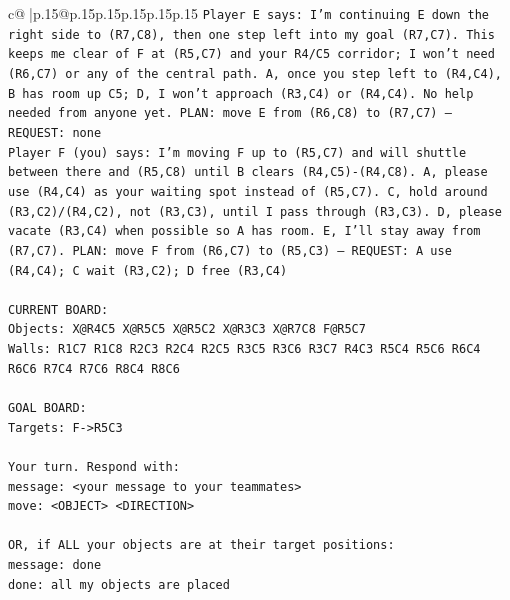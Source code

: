 \documentclass{article}
\begin{document}
{\begin{supertabular}{c@{$\;$}|p{.15\linewidth}@{}p{.15\linewidth}p{.15\linewidth}p{.15\linewidth}p{.15\linewidth}p{.15\linewidth}}
{{{\texttt{Player E says: I'm continuing E down the right side to (R7,C8), then one step left into my goal (R7,C7). This keeps me clear of F at (R5,C7) and your R4/C5 corridor; I won't need (R6,C7) or any of the central path. A, once you step left to (R4,C4), B has room up C5; D, I won't approach (R3,C4) or (R4,C4). No help needed from anyone yet. PLAN: move E from (R6,C8) to (R7,C7) — REQUEST: none} \\
\texttt{Player F (you) says: I'm moving F up to (R5,C7) and will shuttle between there and (R5,C8) until B clears (R4,C5){-}(R4,C8). A, please use (R4,C4) as your waiting spot instead of (R5,C7). C, hold around (R3,C2)/(R4,C2), not (R3,C3), until I pass through (R3,C3). D, please vacate (R3,C4) when possible so A has room. E, I'll stay away from (R7,C7). PLAN: move F from (R6,C7) to (R5,C3) — REQUEST: A use (R4,C4); C wait (R3,C2); D free (R3,C4)} \\
\\ 
\texttt{CURRENT BOARD:} \\
\texttt{Objects: X@R4C5 X@R5C5 X@R5C2 X@R3C3 X@R7C8 F@R5C7} \\
\texttt{Walls: R1C7 R1C8 R2C3 R2C4 R2C5 R3C5 R3C6 R3C7 R4C3 R5C4 R5C6 R6C4 R6C6 R7C4 R7C6 R8C4 R8C6} \\
\\ 
\texttt{GOAL BOARD:} \\
\texttt{Targets: F{-}>R5C3} \\
\\ 
\texttt{Your turn. Respond with:} \\
\texttt{message: <your message to your teammates>} \\
\texttt{move: <OBJECT> <DIRECTION>} \\
\\ 
\texttt{OR, if ALL your objects are at their target positions:} \\
\texttt{message: done} \\
\texttt{done: all my objects are placed} \\
            }
        }
    }
     \\ \\


\end{supertabular}}
\end{document}
